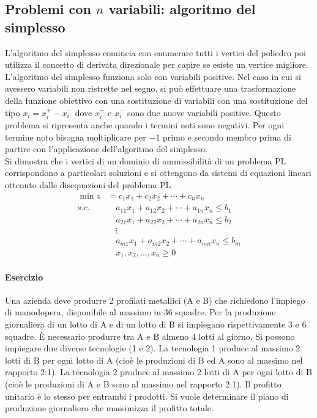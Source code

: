 \documentclass{article}
\begin{document}
\subsection{Problemi con $n$ variabili: algoritmo del simplesso}
L'algoritmo del simplesso comincia con enumerare tutti i vertici del poliedro poi 
utilizza il concetto di derivata direzionale per capire se esiste un vertice migliore. \\ 
L'algoritmo del simplesso funziona solo con variabili positive. Nel caso in cui 
si avessero variabili non ristrette nel segno, si può effettuare una trasformazione 
della funzione obiettivo con una sostituzione di variabili con una sostituzione del tipo 
$x_i = x_i^+ - x_i^-$ dove $x_i^+$ e $x_i^-$ sono due nuove variabili positive.
Questo problema si ripresenta anche quando i termini noti sono negativi. Per ogni 
termine noto bisogna moltiplicare per $-1$ primo e secondo membro prima di partire 
con l'applicazione dell'algoritmo del simplesso.\\

Si dimostra che i vertici di un dominio di ammissibilità di un problema PL 
corrispondono a particolari soluzioni e si ottengono da sistemi di equazioni lineari 
ottenuto dalle disequazioni del problema PL
\begin{align*}
  \min z &= c_1x_1 + c_2x_2 + \cdots + c_n x_n\\
  s.c. &\quad a_{11}x_1 + a_{12}x_2 + \cdots + a_{1n}x_n \leq b_1\\
  &\quad a_{21}x_1 + a_{22}x_2 + \cdots + a_{2n}x_n \leq b_2\\
  &\quad \vdots\\
  &\quad a_{m1}x_1 + a_{m2}x_2 + \cdots + a_{mn}x_n \leq b_m\\
  &\quad x_1,x_2,\dots,x_n \geq 0
\end{align*}

\paragraph{Esercizio}
Una azienda deve produrre 2 profilati metallici (A e B) che richiedono l'impiego 
di manodopera, disponibile al massimo in 36 squadre. Per 
la produzione giornaliera di un lotto di A e di un lotto di B si impiegano rispettivamente 3 e 6 squadre. 
È necessario produrre tra A e B almeno 4 lotti al giorno.
Si possono impiegare due diverse tecnologie (1 e 2).
La tecnologia 1 produce al massimo 2 lotti di B per ogni lotto di A 
(cioè le produzioni di B ed A sono al massimo nel rapporto 2:1).
La tecnologia 2 produce al massimo 2 lotti di A  per ogni lotto di B (cioè le produzioni di A e B sono al massimo nel rapporto 2:1). 
Il profitto unitario è lo stesso per entrambi  i prodotti.
Si vuole determinare il piano di produzione giornaliero che massimizza il profitto totale.
\end{document}
